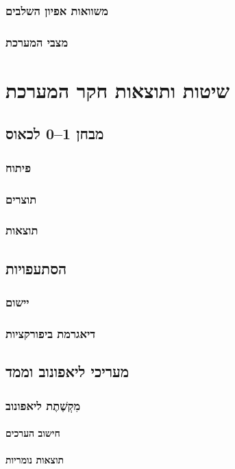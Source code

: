 \documentclass{report}
\begin{document}
\section{משוואות אפיון השלבים}
\section{מצבי המערכת}

\part{שיטות ותוצאות חקר המערכת}
\chapter{מבחן 1–0 לכאוס}
\section{פיתוח}
\section{תוצרים}
\section{תוצאות}
\chapter{הסתעפויות}
\section{יישום}
\section{דיאגרמת ביפורקציות}
\chapter{מעריכי ליאפונוב וממד}
\section{מִקְשֶׁתֶת ליאפונוב}
\subsection{חישוב הערכים}
\subsection{תוצאות נומריות}
\end{document}
